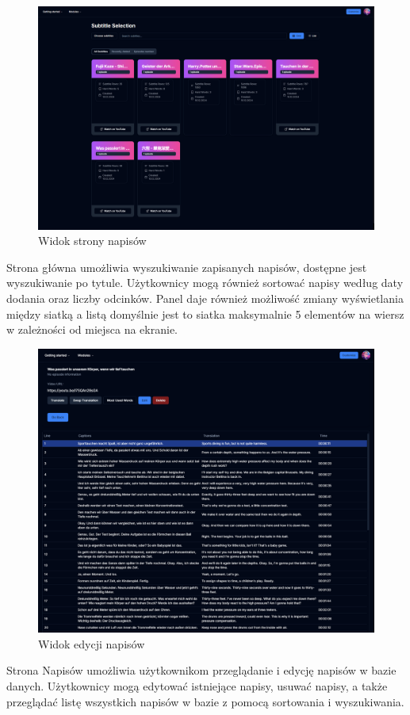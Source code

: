 \begin{figure}[H]
    \centering
    \includegraphics[width=1\textwidth]{IMAGE/Subtitles.png}
    \caption{Widok strony napisów}
    \label{fig:Strona napisów}
\end{figure}
Strona główna umożliwia wyszukiwanie zapisanych napisów, dostępne jest wyszukiwanie po tytule. Użytkownicy mogą również sortować napisy według daty dodania oraz liczby odcinków. Panel daje również możliwość zmiany wyświetlania między siatką a listą domyślnie jest to siatka maksymalnie 5 elementów na wiersz w zależności od miejsca na ekranie.

\begin{figure}[H]
    \centering
    \includegraphics[width=1\textwidth]{IMAGE/SubtitlesSelected.png}
    \caption{Widok edycji napisów}
    \label{fig:Edycja napisów}
\end{figure}
Strona Napisów umożliwia użytkownikom przeglądanie i edycję napisów w bazie danych. Użytkownicy mogą edytować istniejące napisy, usuwać napisy, a także przeglądać listę wszystkich napisów w bazie z pomocą sortowania i wyszukiwania.

